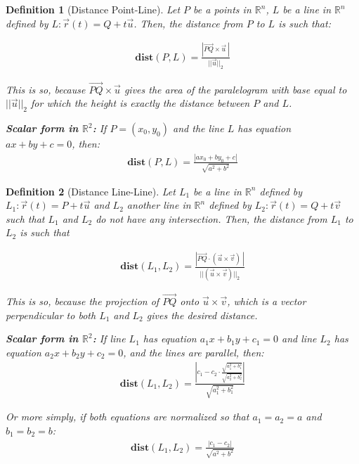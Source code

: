 \documentclass{article}
\newtheorem{definition}{Definition}[section]
\begin{document}
\begin{definition}[Distance Point-Line]
	Let $P$ be a points in $\mathbb{R}^n$, $L$ be a line in $\mathbb{R}^n$  defined by $L:  \vec{r}(t) = Q + t\vec{u}$. Then, the distance from $P$ to $L$ is such that:
	
	\begin{align}
		\mathbf{dist}(P,L) =\frac{ | \vec{PQ} \times \vec{u} \ | }{|| \vec{u}||_2}
	\end{align}	
	
	This is so, because $\vec{PQ} \times \vec{u}$ gives the area of the paralelogram with base equal to $||\vec{u}||_2$ for which the height is exactly the distance between $P$ and $L$.
	
	\textbf{Scalar form in $\mathbb{R}^2$:} If $P = (x_0, y_0)$ and the line $L$ has equation $ax + by + c = 0$, then:
	\begin{align}
		\mathbf{dist}(P,L) = \frac{|ax_0 + by_0 + c|}{\sqrt{a^2 + b^2}}
	\end{align}
\end{definition}

\begin{definition}[Distance Line-Line]
	Let $L_1$ be a line in $\mathbb{R}^n$  defined by $L_1:  \vec{r}(t) = P + t\vec{u}$ and $L_2$ another line in $\mathbb{R}^n$ defined by  $L_2:  \vec{r}(t) = Q + t\vec{v}$ such that $L_1$ and $L_2$ do not have any intersection. Then, the distance from $L_1$ to $L_2$ is such that
	
	\begin{align}
		\mathbf{dist}(L_1,L_2) =\frac{ | \vec{PQ} \cdot (\vec{u} \times \vec{v}) \ | }{|| (\vec{u} \times \vec{v}) ||_2}
	\end{align}	
	
	This is so, because the projection of $\vec{PQ}$ onto $\vec{u} \times \vec{v}$, which is a vector perpendicular to both $L_1$ and $L_2$ gives the desired distance.
	
	\textbf{Scalar form in $\mathbb{R}^2$:} If line $L_1$ has equation $a_1x + b_1y + c_1 = 0$ and line $L_2$ has equation $a_2x + b_2y + c_2 = 0$, and the lines are parallel, then:
	\begin{align}
		\mathbf{dist}(L_1,L_2) = \frac{|c_1 - c_2 \cdot \frac{\sqrt{a_1^2 + b_1^2}}{\sqrt{a_2^2 + b_2^2}}|}{\sqrt{a_1^2 + b_1^2}}
	\end{align}
	
	Or more simply, if both equations are normalized so that $a_1 = a_2 = a$ and $b_1 = b_2 = b$:
	\begin{align}
		\mathbf{dist}(L_1,L_2) = \frac{|c_1 - c_2|}{\sqrt{a^2 + b^2}}
	\end{align}
\end{definition}
\end{document}
